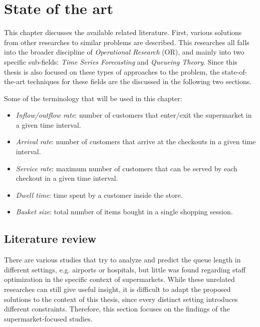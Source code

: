 \chapter{State of the art}
\label{cha:state_of_the_art}

This chapter discusses the available related literature. First, various solutions from other researches to similar problems are described. This researches all falls into the broader discipline of \emph{Operational Research} (OR), and mainly into two specific sub-fields: \emph{Time Series Forecasting} and \emph{Queueing Theory}. Since this thesis is also focused on these types of approaches to the problem, the state-of-the-art techniques for these fields are the discussed in the following two sections.

Some of the terminology that will be used in this chapter:
\begin{itemize}
  \item \emph{Inflow/outflow rate}: number of customers that enter/exit the supermarket in a given time interval.
  \item \emph{Arrival rate}: number of customers that arrive at the checkouts in a given time interval.
  \item \emph{Service rate}: maximum number of customers that can be served by each checkout in a given time interval.
  \item \emph{Dwell time}: time spent by a customer inside the store.
  \item \emph{Basket size}: total number of items bought in a single shopping session.
\end{itemize}

\section{Literature review}
\label{sec:literature_review}

There are various studies that try to analyze and predict the queue length in different settings, e.g. airports or hospitals, but little was found regarding staff optimization in the specific context of supermarkets. While these unrelated researches can still give useful insight, it is difficult to adapt the proposed solutions to the context of this thesis, since every distinct setting introduces different constraints. Therefore, this section focuses on the findings of the supermarket-focused studies.

